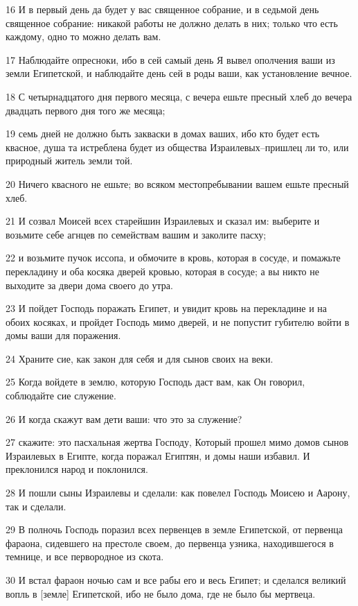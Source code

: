 \par 16 И в первый день да будет у вас священное собрание, и в седьмой день священное собрание: никакой работы не должно делать в них; только что есть каждому, одно то можно делать вам.
\par 17 Наблюдайте опресноки, ибо в сей самый день Я вывел ополчения ваши из земли Египетской, и наблюдайте день сей в роды ваши, как установление вечное.
\par 18 С четырнадцатого дня первого месяца, с вечера ешьте пресный хлеб до вечера двадцать первого дня того же месяца;
\par 19 семь дней не должно быть закваски в домах ваших, ибо кто будет есть квасное, душа та истреблена будет из общества Израилевых--пришлец ли то, или природный житель земли той.
\par 20 Ничего квасного не ешьте; во всяком местопребывании вашем ешьте пресный хлеб.
\par 21 И созвал Моисей всех старейшин Израилевых и сказал им: выберите и возьмите себе агнцев по семействам вашим и заколите пасху;
\par 22 и возьмите пучок иссопа, и обмочите в кровь, которая в сосуде, и помажьте перекладину и оба косяка дверей кровью, которая в сосуде; а вы никто не выходите за двери дома своего до утра.
\par 23 И пойдет Господь поражать Египет, и увидит кровь на перекладине и на обоих косяках, и пройдет Господь мимо дверей, и не попустит губителю войти в домы ваши для поражения.
\par 24 Храните сие, как закон для себя и для сынов своих на веки.
\par 25 Когда войдете в землю, которую Господь даст вам, как Он говорил, соблюдайте сие служение.
\par 26 И когда скажут вам дети ваши: что это за служение?
\par 27 скажите: это пасхальная жертва Господу, Который прошел мимо домов сынов Израилевых в Египте, когда поражал Египтян, и домы наши избавил. И преклонился народ и поклонился.
\par 28 И пошли сыны Израилевы и сделали: как повелел Господь Моисею и Аарону, так и сделали.
\par 29 В полночь Господь поразил всех первенцев в земле Египетской, от первенца фараона, сидевшего на престоле своем, до первенца узника, находившегося в темнице, и все первородное из скота.
\par 30 И встал фараон ночью сам и все рабы его и весь Египет; и сделался великий вопль в [земле] Египетской, ибо не было дома, где не было бы мертвеца.
